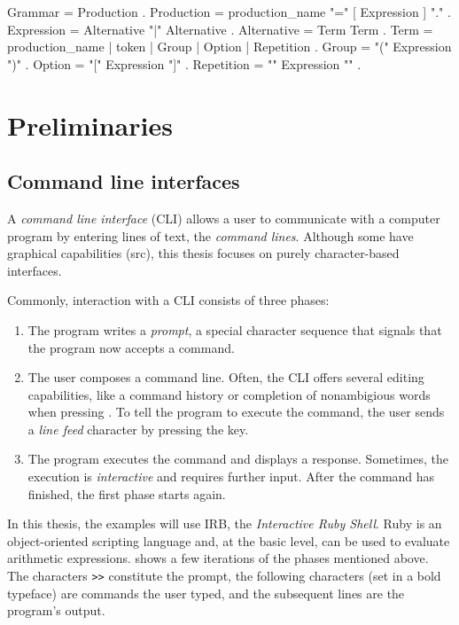 \documentclass[paper=a4,twoside,abstract=on,cleardoublepage=empty,numbers=noenddot,toc=bib,12pt,appendixprefix=true]{scrreprt}
\begin{document}
\begin{ebnf}
Grammar     = { Production } .
Production  = production_name "=" [ Expression ] "." .
Expression  = Alternative { "|" Alternative } .
Alternative = Term { Term } .
Term        = production_name | token | Group | Option | Repetition .
Group       = "(" Expression ")" .
Option      = "[" Expression "]" .
Repetition  = "{" Expression "}" .
\end{ebnf}

\chapter{Preliminaries}
\label{sec:preliminaries}

\section{Command line interfaces}
\label{sec:cli}

A \emph{command line interface} (\textsc{CLI}) allows a user to communicate with a computer program by entering lines of text, the \emph{command lines}. Although some have graphical capabilities (src), this thesis focuses on purely character-based interfaces.

Commonly, interaction with a \textsc{CLI} consists of three phases:

\begin{enumerate}
    \item The program writes a \emph{prompt}, a special character sequence that signals that the program now accepts a command.
    \item The user composes a command line. Often, the CLI offers several editing capabilities, like a command history or completion of nonambigious words when pressing . To tell the program to execute the command, the user sends a \emph{line feed} character by pressing the  key.
    \item The program executes the command and displays a response. Sometimes, the execution is \emph{interactive} and requires further input. After the command has finished, the first phase starts again.
\end{enumerate}

In this thesis, the examples will use IRB, the \emph{Interactive Ruby Shell}. Ruby is an object-oriented scripting language and, at the basic level, can be used to evaluate arithmetic expressions.  shows a few iterations of the phases mentioned above. The characters \texttt{>\->} constitute the prompt, the following characters (set in a bold typeface) are commands the user typed, and the subsequent lines are the program's output.
\end{document}
